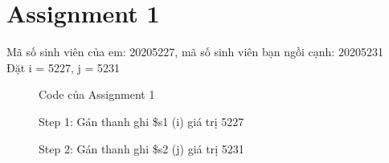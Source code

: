 \documentclass[a4paper,12pt]{article}
\begin{document}
\section{Assignment 1}
Mã số sinh viên của em: 20205227, mã số sinh viên bạn ngồi cạnh: 20205231 \\
Đặt i = 5227, j = 5231 \\
\begin{figure}[!h]
	\centerline{}
	\caption{Code của Assignment 1}
	\label{fig:ass1}
\end{figure}
\begin{figure}[!h]
	\centerline{}
	\caption*{Step 1: Gán thanh ghi \$s1 (i) giá trị 5227}
	\label{fig:s1}
\end{figure}
\begin{figure}[!h]
	\centerline{}
	\caption*{Step 2: Gán thanh ghi \$s2 (j) giá trị 5231}
	\label{fig:s2}
\end{figure}
\end{document}
